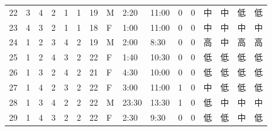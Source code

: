 \begin{table}[htbp]
{\begin{tabular}{llllllllllllllll}
22                  & 3                    & 4                    & 2                    & 1                    & 1                  & 19                     & M                   & 2:20                  & 11:00                 & 0                    & 0                    & 中     & 中     & 低     & 低     \\
23                  & 4                    & 3                    & 2                    & 1                    & 1                  & 18                     & F                   & 1:00                  & 11:00                 & 0                    & 0                    & 中     & 中     & 中     & 中     \\
24                  & 1                    & 2                    & 3                    & 4                    & 2                  & 19                     & M                   & 2:00                  & 8:30                  & 0                    & 0                    & 高     & 中     & 高     & 高     \\
25                  & 1                    & 2                    & 4                    & 3                    & 2                  & 22                     & F                   & 1:40                  & 10:30                 & 0                    & 0                    & 低     & 低     & 低     & 低     \\
26                  & 1                    & 3                    & 2                    & 4                    & 2                  & 21                     & F                   & 4:30                  & 10:00                 & 0                    & 0                    & 低     & 低     & 低     & 低     \\
27                  & 1                    & 4                    & 2                    & 3                    & 2                  & 22                     & F                   & 3:00                  & 11:00                 & 1                    & 0                    & 中     & 低     & 低     & 低     \\
28                  & 1                    & 3                    & 4                    & 2                    & 2                  & 22                     & M                   & 23:30                 & 13:30                 & 1                    & 0                    & 低     & 中     & 中     & 中     \\
29                  & 1                    & 4                    & 3                    & 2                    & 2                  & 22                     & F                   & 2:30                  & 9:30                  & 0                    & 0                    & 低     & 低     & 中     & 低     \\

\end{tabular}}
\end{table}
